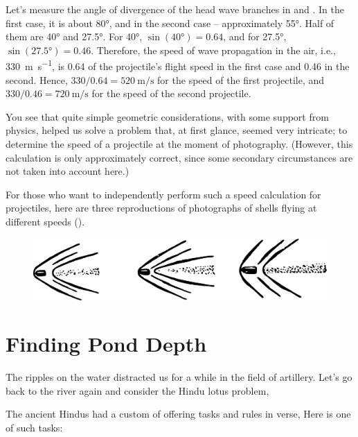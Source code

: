 \ans Let's measure the angle of divergence of the head wave branches in  and . In the first case, it is about \ang{80}, and in the second case -- approximately \ang{55}. Half of them are \ang{40} and \ang{27.5}. For \ang{40}, $\sin(\ang{40}) = 0.64$, and for \ang{27.5}, $\sin(\ang{27.5}) = 0.46$. Therefore, the speed of wave propagation in the air, i.e., \SI{330}{\meter\per\second}, is 0.64 of the projectile's flight speed in the first case and 0.46 in the second. Hence, $330 / 0.64 = \SI{520}{\meter\per\second}$ for the speed of the first projectile, and $330 / 0.46 = \SI{720}{\meter\per\second}$ for the speed of the second projectile.

You see that quite simple geometric considerations, with some support from physics, helped us solve a problem that, at first glance, seemed very intricate; to determine the speed of a projectile at the moment of photography. (However, this calculation is only approximately correct, since some secondary circumstances are not taken into account here.)

For those who want to independently perform such a speed calculation for projectiles, here are three reproductions of photographs of shells flying at different speeds ().

\begin{figure}[h!]
\centering
\includegraphics[width=\textwidth]{figures/ch-02/fig-052.pdf}
\end{figure}

\section{Finding Pond Depth}
\label{sec-2.15}

The ripples on the water distracted us for a while in the field of artillery. Let's go back to the river again and consider the Hindu lotus problem,

The ancient Hindus had a custom of offering tasks and rules in verse, Here is one of such tasks:

